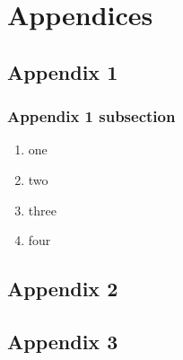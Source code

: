 \newpage

% 

\printbibliography


\newpage
\section{Appendices}

\subsection{Appendix 1}
\subsubsection{Appendix 1 subsection}

\begin{enumerate}

  \item one
  \item two
  \item three
  \item four

\end{enumerate}


\subsection{Appendix 2}

\subsection{Appendix 3}






